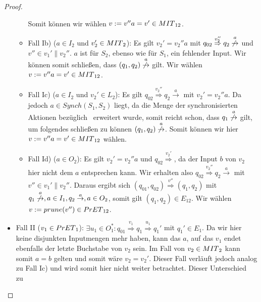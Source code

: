 \begin{proof}
\begin{itemize}
\begin{itemize}
          Somit können wir wählen $v:=v''a=v'\in MIT{}_{12}$.
        \item Fall Ib) ($a\in I_2$ und $v_2'\in MIT{}_2$): Es gilt $v_2'=v_2''a$
          mit $q_{02} \overset{v_2''}{\Rightarrow} q_2
          \overset{a}{\not{\hspace{-0.1cm}\rightarrow}}$ und $v''\in
          v_1'\|v_2''$. $a$ ist  für $S_2$, ebenso wie für $S_1$, ein fehlender
          Input. Wir können somit schließen, dass $(q_1,q_2)
          \overset{a}{\not{\hspace{-0.1cm}\rightarrow}}$ gilt. Wir wählen
          $v:=v''a=v'\in MIT{}_{12}$.
        \item Fall Ic) ($a\in I_2$ und $v_2'\in L_2$): Es gilt $q_{02}
          \overset{v_2''}{\Rightarrow} q_2 \overset{a}{\rightarrow}$ mit
          $v_2'=v_2''a$. Da jedoch $a\in Synch(S_1,S_2)$ liegt, da die Menge
          der synchronisierten Aktionen bezüglich~\cite{Vogler2014EIO}
          erweitert wurde, somit reicht schon, dass $q_1
          \overset{a}{\not{\hspace{-0.1cm}\rightarrow}}$ gilt, um folgendes
          schließen zu können $(q_1,q_2)
          \overset{a}{\not{\hspace{-0.1cm}\rightarrow}}$. Somit können wir hier
          $v:=v''a=v'\in MIT{}_{12}$ wählen.
        \item Fall Id) ($a\in O_2$): Es gilt $v_2'=v_2''a$ und $q_{02}
          \overset{v_2'}{\Rightarrow}$, da der Input $b$ von $v_2$ hier nicht
          dem $a$ entsprechen kann. Wir erhalten also $q_{02}
          \overset{v_2''}{\Rightarrow} q_2 \overset{a}{\rightarrow}$ mit
          $v''\in v_1'\|v_2''$. Daraus ergibt sich $(q_{01},q_{02})
          \overset{v''}{\Rightarrow} (q_1,q_2)$ mit $q_1
          \overset{a}{\not{\hspace{-0.1cm}\rightarrow}},a\in I_1, q_2
          \overset{a}{\rightarrow},a\in O_2$, somit gilt $(q_1,q_2)\in
          E_{12}$. Wir wählen $v:=prune{}(v'')\in PrET{}_{12}$.
      \end{itemize}
  \item Fall II ($v_1\in PrET{}_1$): $\exists u_1\in O_1^*:q_{01}
    \overset{v_1}{\Rightarrow} q_1 \overset{u_1}{\Rightarrow} q_1'$ mit
    $q_1'\in E_1$. Da wir hier keine disjunkten Inputmengen mehr haben, kann
    das $a$, auf das $v_1$ endet ebenfalls der letzte Buchstabe von $v_2$
    sein. Im Fall von $v_2\in MIT{}_2$ kann somit $a=b$ gelten und somit wäre
    $v_2=v_2'$. Dieser Fall verläuft jedoch analog zu Fall Ic) und wird somit
    hier nicht weiter betrachtet. Dieser Unterschied zu~\cite{Vogler2014EIO}

\end{itemize}
\end{proof}
